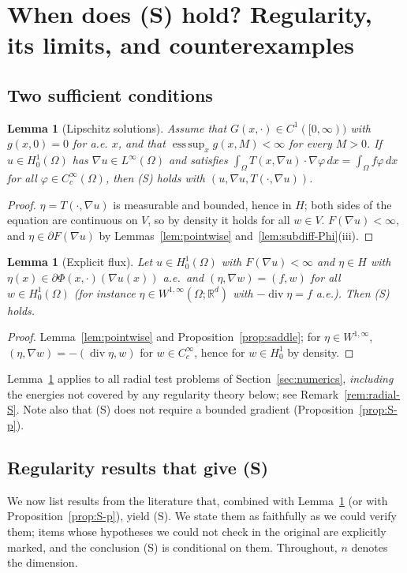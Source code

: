 \documentclass[11pt]{amsart}
\newtheorem{lemma}[theorem]{Lemma}
\theoremstyle{definition}
\theoremstyle{remark}
\numberwithin{equation}{section}
\newcommand{\R}{\mathbb{R}}
\newcommand{\dx}{\,dx}
\DeclareMathOperator{\divg}{div}
\begin{document}
\section{When does (S) hold? Regularity, its limits, and counterexamples}\label{sec:S}

\subsection{Two sufficient conditions}
\begin{lemma}[Lipschitz solutions]\label{lem:lipschitz}
Assume that $G(x,\cdot)\in C^1([0,\infty))$ with $g(x,0)=0$ for a.e. $x$, and that $\operatorname*{ess\,sup}_xg(x,M)<\infty$ for every $M>0$. If $u\in H^1_0(\Omega)$ has $\nabla u\in L^\infty(\Omega)$ and satisfies $\int_\Omega T(x,\nabla u)\cdot\nabla\varphi\dx=\int_\Omega f\varphi\dx$ for all $\varphi\in C^\infty_c(\Omega)$, then (S) holds with $(u,\nabla u,T(\cdot,\nabla u))$.
\end{lemma}
\begin{proof}
$\eta=T(\cdot,\nabla u)$ is measurable and bounded, hence in $H$; both sides of the equation are continuous on $V$, so by density it holds for all $w\in V$. $F(\nabla u)<\infty$, and $\eta\in\partial F(\nabla u)$ by Lemmas~\ref{lem:pointwise} and~\ref{lem:subdiff-Phi}(iii).
\end{proof}

\begin{lemma}[Explicit flux]\label{lem:explicit}
Let $u\in H^1_0(\Omega)$ with $F(\nabla u)<\infty$ and $\eta\in H$ with $\eta(x)\in\partial\Phi(x,\cdot)(\nabla u(x))$ a.e.\ and $(\eta,\nabla w)=(f,w)$ for all $w\in H^1_0(\Omega)$ \textup(for instance $\eta\in W^{1,\infty}(\Omega;\R^d)$ with $-\divg\eta=f$ a.e.\textup). Then (S) holds.
\end{lemma}
\begin{proof}
Lemma~\ref{lem:pointwise} and Proposition~\ref{prop:saddle}; for $\eta\in W^{1,\infty}$, $(\eta,\nabla w)=-(\divg\eta,w)$ for $w\in C^\infty_c$, hence for $w\in H^1_0$ by density.
\end{proof}

Lemma~\ref{lem:explicit} applies to all radial test problems of Section~\ref{sec:numerics}, \emph{including} the energies not covered by any regularity theory below; see Remark~\ref{rem:radial-S}. Note also that (S) does not require a bounded gradient (Proposition~\ref{prop:S-p}).

\subsection{Regularity results that give (S)}\label{ssec:regularity}
We now list results from the literature that, combined with Lemma~\ref{lem:lipschitz} (or with Proposition~\ref{prop:S-p}), yield (S). We state them as faithfully as we could verify them; items whose hypotheses we could not check in the original are explicitly marked, and the conclusion (S) is conditional on them. Throughout, $n$ denotes the dimension.
\end{document}
